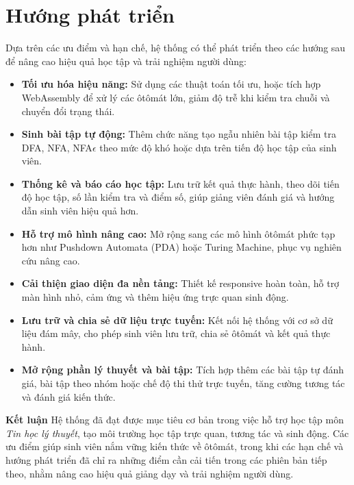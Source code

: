 \documentclass[12pt,a4paper]{report}
\begin{document}
\section{Hướng phát triển}
\hspace*{0.7cm}Dựa trên các ưu điểm và hạn chế, hệ thống có thể phát triển theo các hướng sau để nâng cao hiệu quả học tập và trải nghiệm người dùng:

\begin{itemize}
    \item \textbf{Tối ưu hóa hiệu năng:} Sử dụng các thuật toán tối ưu, hoặc tích hợp WebAssembly để xử lý các ôtômát lớn, giảm độ trễ khi kiểm tra chuỗi và chuyển đổi trạng thái.
    \item \textbf{Sinh bài tập tự động:} Thêm chức năng tạo ngẫu nhiên bài tập kiểm tra DFA, NFA, NFA$\epsilon$ theo mức độ khó hoặc dựa trên tiến độ học tập của sinh viên.
    \item \textbf{Thống kê và báo cáo học tập:} Lưu trữ kết quả thực hành, theo dõi tiến độ học tập, số lần kiểm tra và điểm số, giúp giảng viên đánh giá và hướng dẫn sinh viên hiệu quả hơn.
    \item \textbf{Hỗ trợ mô hình nâng cao:} Mở rộng sang các mô hình ôtômát phức tạp hơn như Pushdown Automata (PDA) hoặc Turing Machine, phục vụ nghiên cứu nâng cao.
    \item \textbf{Cải thiện giao diện đa nền tảng:} Thiết kế responsive hoàn toàn, hỗ trợ màn hình nhỏ, cảm ứng và thêm hiệu ứng trực quan sinh động.
    \item \textbf{Lưu trữ và chia sẻ dữ liệu trực tuyến:} Kết nối hệ thống với cơ sở dữ liệu đám mây, cho phép sinh viên lưu trữ, chia sẻ ôtômát và kết quả thực hành.
    \item \textbf{Mở rộng phần lý thuyết và bài tập:} Tích hợp thêm các bài tập tự đánh giá, bài tập theo nhóm hoặc chế độ thi thử trực tuyến, tăng cường tương tác và đánh giá kiến thức.
\end{itemize}

\textbf{Kết luận}
Hệ thống đã đạt được mục tiêu cơ bản trong việc hỗ trợ học tập môn \emph{Tin học lý thuyết}, tạo môi trường học tập trực quan, tương tác và sinh động. Các ưu điểm giúp sinh viên nắm vững kiến thức về ôtômát, trong khi các hạn chế và hướng phát triển đã chỉ ra những điểm cần cải tiến trong các phiên bản tiếp theo, nhằm nâng cao hiệu quả giảng dạy và trải nghiệm người dùng.
\end{document}
